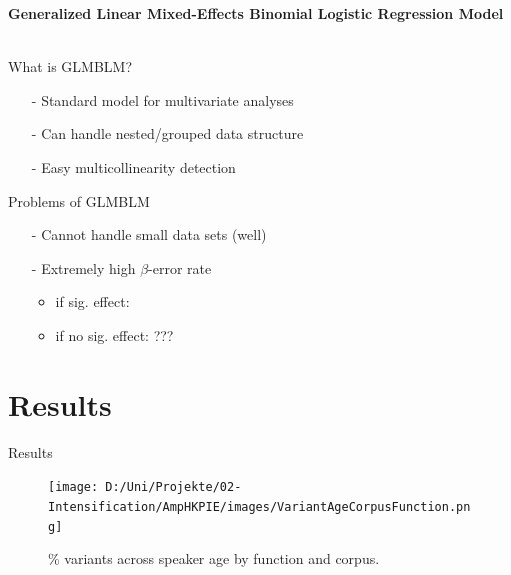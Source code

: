 \documentclass[12pt, table]{beamer}
\newcommand{\cmark}{\ding{51}}%
\begin{document}
\begin{frame}
\textbf{Generalized Linear Mixed-Effects Binomial Logistic Regression Model}\\
\textcolor{gray}{\begin{scriptsize}\citep{baayen2008analyzing, faraway2016extending}\end{scriptsize}}\\[.5cm]
What is GLMBLM?
\begin{itemize}
\item[-] Standard model for multivariate analyses
\item[-] Can handle nested/grouped data structure
\item[-] Easy multicollinearity detection
\end{itemize}
Problems of GLMBLM
\begin{itemize}
\item[-] Cannot handle small data sets (well)
\item[-] Extremely high $\beta$-error rate \textcolor{gray}{\begin{scriptsize}\citep{johnson2009getting}\end{scriptsize}}
\begin{itemize}
\item if sig. effect: \textcolor{green}{\cmark}\\
\item if no sig. effect: \textcolor{uq}{???}
\end{itemize}
\end{itemize}
\end{frame}

\section{Results}
\begin{frame}
\begin{center}
\begin{large}
\end{large}
\end{center}
\end{frame}

\begin{frame}
Results
\begin{figure}[!htb]
\centering
\texttt{[image: D:/Uni/Projekte/02-Intensification/AmpHKPIE/images/VariantAgeCorpusFunction.png]}
\caption{\tiny \% variants across speaker age by function and corpus.}
\label{fig:VariantAgeFunctionCorpus}
\end{figure} 
\end{frame} 
\end{document}
